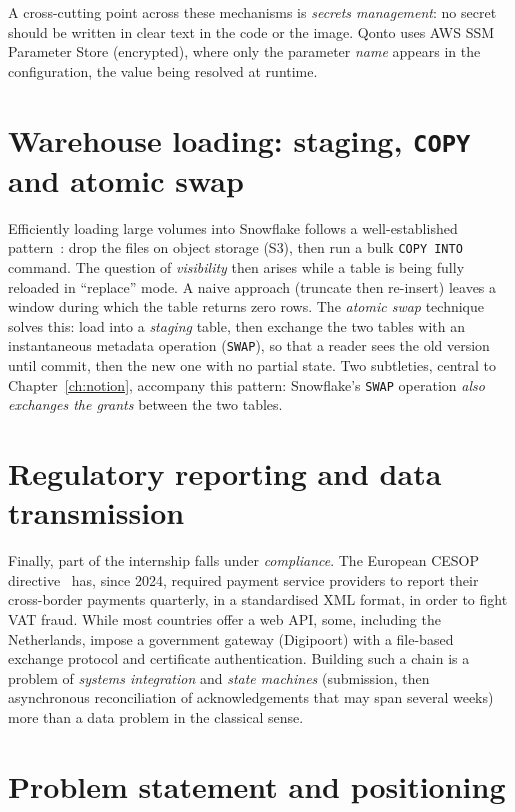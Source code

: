 A cross-cutting point across these mechanisms is \emph{secrets management}: no secret should be written in clear text in the code or the image. Qonto uses AWS SSM Parameter Store (encrypted), where only the parameter \emph{name} appears in the configuration, the value being resolved at runtime.

\section{Warehouse loading: staging, \texttt{COPY} and atomic swap}

Efficiently loading large volumes into Snowflake follows a well-established pattern~\cite{snowflake-copy}: drop the files on object storage (S3), then run a bulk \texttt{COPY INTO} command. The question of \emph{visibility} then arises while a table is being fully reloaded in ``replace'' mode. A naive approach (truncate then re-insert) leaves a window during which the table returns zero rows. The \emph{atomic swap} technique solves this: load into a \emph{staging} table, then exchange the two tables with an instantaneous metadata operation (\texttt{SWAP}), so that a reader sees the old version until commit, then the new one with no partial state. Two subtleties, central to Chapter~\ref{ch:notion}, accompany this pattern: Snowflake's \texttt{SWAP} operation \emph{also exchanges the grants} between the two tables.

\section{Regulatory reporting and data transmission}

Finally, part of the internship falls under \emph{compliance}. The European CESOP directive~\cite{cesop-eu} has, since 2024, required payment service providers to report their cross-border payments quarterly, in a standardised XML format, in order to fight VAT fraud. While most countries offer a web API, some, including the Netherlands, impose a government gateway (Digipoort) with a file-based exchange protocol and certificate authentication. Building such a chain is a problem of \emph{systems integration} and \emph{state machines} (submission, then asynchronous reconciliation of acknowledgements that may span several weeks) more than a data problem in the classical sense.

\section{Problem statement and positioning}\label{sec:pb}

